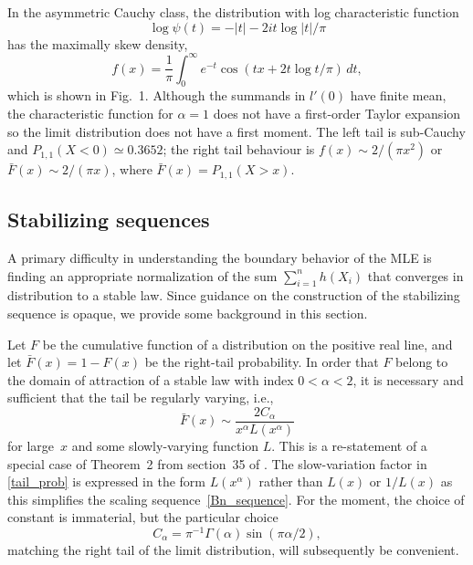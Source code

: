 \documentclass[11pt]{article}
\theoremstyle{definition}
\begin{document}
In the asymmetric Cauchy class, the distribution with log characteristic function
\[
\log \psi(t) = -|t| - 2i t \log|t| /\pi
\]
has the maximally skew density,
%
\begin{equation}\label{skew_cauchy_density}
f(x) = \frac 1 \pi \int_0^\infty e^{-t} \cos(t x + 2t\log t/\pi)\, dt,
\end{equation}
%
which is shown in Fig.~1. Although the summands in $l'(0)$ have finite mean, the characteristic function for $\alpha=1$
does not have a first-order Taylor expansion so the limit distribution does not have a first moment. The left tail is sub-Cauchy and $P_{1,1}(X < 0) \simeq 0.3652$; the right tail behaviour is $f(x) \sim 2/(\pi x^2)$ or $\bar F(x) \sim 2/(\pi x)$, where $\bar F(x)=P_{1,1}(X>x)$.

\subsection{Stabilizing sequences}
\label{subsec:stabilizing-seq}

A primary difficulty in understanding the boundary behavior of the MLE is finding an appropriate normalization of the sum $\sum_{i=1}^n h(X_i)$ that converges in distribution to a stable law. Since guidance on the construction of the stabilizing sequence is opaque, we provide some background in this section. 

Let $F$ be the cumulative function of a distribution on the positive real line, and let $\bar F(x) = 1 - F(x)$ be the right-tail probability. In order that $F$ belong to the domain of attraction of a stable law with index $0 < \alpha < 2$,
it is necessary and sufficient that the tail be regularly varying, i.e.,
\begin{equation}\label{tail_prob}
\bar F(x) \sim \frac{2C_\alpha} {x^\alpha L(x^\alpha)}
\end{equation}
for large~$x$ and some slowly-varying function $L$.
This is a re-statement of a special case of Theorem~2 from section~35 of \citet{GK1954}. The slow-variation factor in \eqref{tail_prob} is expressed in the form $L(x^\alpha)$ rather than $L(x)$ or $1/L(x)$ as this simplifies the scaling sequence~\eqref{Bn_sequence}. For the moment, the choice of constant is immaterial, but the particular choice
%
\begin{equation}\label{eqC}
C_\alpha = \pi^{-1} \Gamma(\alpha)\sin(\pi\alpha/2),
\end{equation}
matching the right tail of the limit distribution, will subsequently be convenient.
\end{document}

